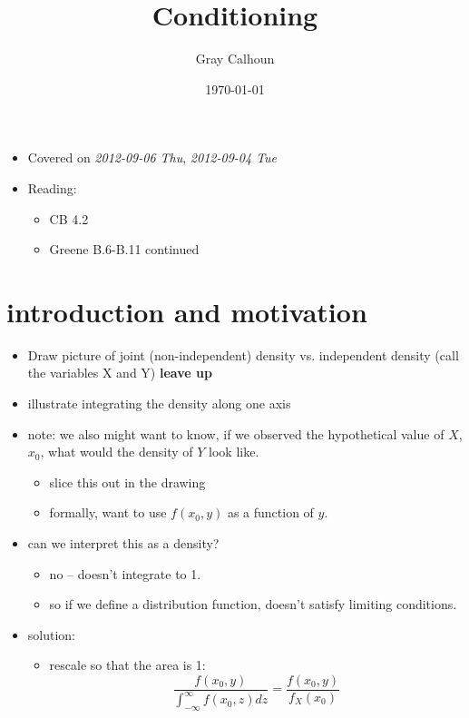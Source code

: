 \documentclass[11pt]{article}
\title{Conditioning}
\author{Gray Calhoun}
\date{\today}
\begin{document}
\maketitle

\setcounter{tocdepth}{2}
\tableofcontents
\vspace*{1cm}
\begin{itemize}
\item Covered on \textit{2012-09-06 Thu}, \textit{2012-09-04 Tue}
\item Reading:
\begin{itemize}
\item CB 4.2
\item Greene B.6-B.11 continued
\end{itemize}
\end{itemize}
\section{introduction and motivation}
\label{sec-1}

\begin{itemize}
\item Draw picture of joint (non-independent) density vs. independent
      density (call the variables X and Y) \textbf{leave up}
\item illustrate integrating the density along one axis
\item note: we also might want to know, if we observed the hypothetical
      value of $X$, $x_0$, what would the density of $Y$ look like.
\begin{itemize}
\item slice this out in the drawing
\item formally, want to use $f(x_0, y)$ as a function of $y$.
\end{itemize}
\item can we interpret this as a density?
\begin{itemize}
\item no -- doesn't integrate to 1.
\item so if we define a distribution function, doesn't satisfy
        limiting conditions.
\end{itemize}
\item solution:
\begin{itemize}
\item rescale so that the area is 1:
        \[ \frac{f(x_0, y)}{\int_{-\infty}^{\infty} f(x_0, z) dz} =
        \frac{f(x_0, y)}{f_X(x_0)}\]
\end{itemize}
\end{itemize}
\end{document}
